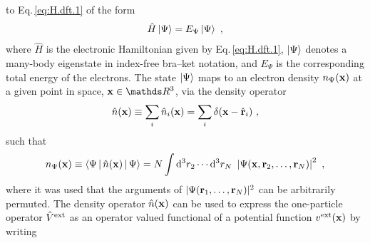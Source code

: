  to Eq.\,\eqref{eq:H.dft.1} of the form
\begin{align}
	\hat H \Ket{\Psi} = E_\Psi \Ket{\Psi}~,
	\label{eq:SE.dft.1}
\end{align}
where $\hat H$ is the electronic Hamiltonian given by Eq.\,\eqref{eq:H.dft.1}, $\Ket{\Psi}$ denotes a many-body eigenstate in index-free bra--ket notation,
and $E_\Psi$ is the corresponding total energy of the electrons.
The state $\Ket{\Psi}$ maps to an electron density $n_\Psi ({\bf x})$ at a given point in space, ${\bf x} \in \mathds R^3$, via the density operator
\begin{align}
	\hat n ({\bf x}) \equiv \sum_i \hat n_i ({\bf x}) = \sum_i \delta ({\bf x} - \hat{\bf r}_i)~,
	\label{eq:densop}
\end{align}
such that
\begin{align}
	n_\Psi({\bf x}) 
	\equiv \Braket{\Psi | \hat n({\bf x}) | \Psi} 
	= N \int {\rm d}^3 r_2 \cdots {\rm d}^3 r_{N} ~ 
	\left\lvert 
	\Psi ({\bf x}, {\bf r}_2, \ldots, {\bf r}_N) 
	\right\rvert^2~,
\end{align}
where it was used that the arguments of $\lvert \Psi ({\bf r}_1, \ldots, {\bf r}_N) \rvert^2$ can be arbitrarily permuted. %
The density operator $\hat n ({\bf x})$ can be used to express the one-particle operator $\hat{V}^{\rm ext}$ as an operator valued functional of a potential function $v^{\rm ext} ({\bf x})$ by writing
